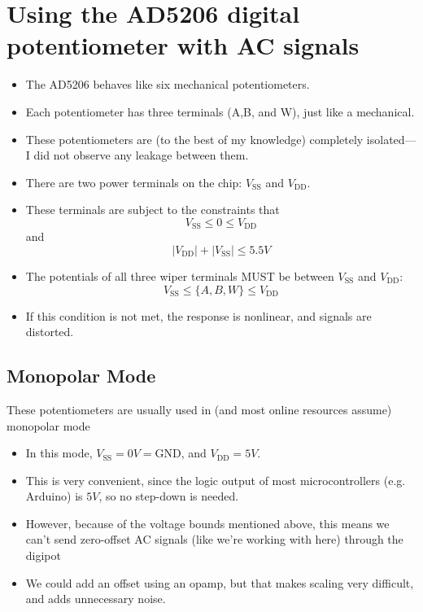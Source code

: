 \documentclass[fleqn]{article}
\begin{document}
    \section*{Using the AD5206 digital potentiometer with AC signals}

    \begin{itemize}
        \item The AD5206 behaves like six mechanical potentiometers.
        \item Each potentiometer has three terminals (A,B, and W), just like a mechanical.
        \item These potentiometers are (to the best of my knowledge) completely isolated---I did not observe any leakage between them.
        \item There are two power terminals on the chip: $V_{\text{SS}}$ and $V_{\text{DD}}$.
        \item These terminals are subject to the constraints that
        \begin{equation*}
            V_{\text{SS}} \leq 0 \leq V_{\text{DD}}
        \end{equation*}
        and
        \begin{equation*}
            |V_{\text{DD}}| + |V_{\text{SS}}| \leq 5.5V
        \end{equation*}
        \item The potentials of all three wiper terminals MUST be between $V_\text{SS}$ and $V_\text{DD}$:
        \begin{equation*}
            V_\text{SS} \leq \{A,B,W\} \leq V_\text{DD}
        \end{equation*}
        \item If this condition is not met, the response is nonlinear, and signals are distorted.
    \end{itemize}
    \subsection*{Monopolar Mode}
        These potentiometers are usually used in (and most online resources assume) monopolar mode
        \begin{itemize}
            \item In this mode, $V_{\text{SS}} = 0V = \text{GND}$, and $V_{\text{DD}} = 5V$.
            \item This is very convenient, since the logic output of most microcontrollers (e.g. Arduino) is $5V$, so no step-down is needed.
            \item However, because of the voltage bounds mentioned above, this means we can't send zero-offset AC signals (like we're working with here) through the digipot
            \item We could add an offset using an opamp, but that makes scaling very difficult, and adds unnecessary noise.
        \end{itemize}
\end{document}
